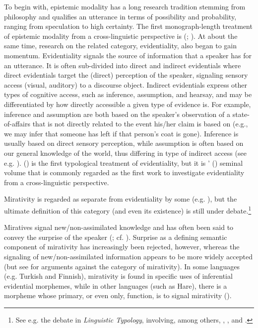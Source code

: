 \documentclass[output=paper]{langsci/langscibook}
\begin{document}
To begin with, epistemic modality has a long research tradition stemming from philosophy and qualifies an utterance in terms of possibility and probability, ranging from speculation to high certainty. The first monograph-length treatment of epistemic modality from a cross-linguistic perspective is \citeauthor{Palmer1986} (\citeyear{Palmer1986}; \citeyear{Palmer2001}). At about the same time, research on the related category, evidentiality, also began to gain momentum. Evidentiality signals the source of information that a speaker has for an utterance. It is often sub-divided into direct and indirect evidentials where direct evidentials target the (direct) perception of the speaker, signaling sensory access (visual, auditory) to a discourse object. Indirect evidentials express other types of cognitive access, such as inference, assumption, and hearsay, and may be differentiated by how directly accessible a given type of evidence is. For example, inference and assumption are both based on the speaker’s observation of a state-of-affairs that is not directly related to the event his/her claim is based on (e.g., we may infer that someone has left if that person’s coat is gone). Inference is usually based on direct sensory perception, while assumption is often based on our general knowledge of the world, thus differing in type of indirect access (see e.g. \citealt{Willett1988}). \citeauthor{Aikhenvald2004} (\citeyear{Aikhenvald2004}) is the first typological treatment of evidentiality, but it is \citeauthor{ChafeNichols1986}’ (\citeyear{ChafeNichols1986}) seminal volume that is commonly regarded as the first work to investigate evidentiality from a cross-linguistic perspective.

Mirativity is regarded as separate from evidentiality by some (e.g. \citealt{DeLancey1997}), but the ultimate definition of this category (and even its existence) is still under debate.\footnote{See e.g. the debate in \emph{Linguistic Typology}, involving, among others, \cite{Hill2012}, \cite{DeLancey2012}, and \cite{HengeveldOlbertz2012}.}

Miratives signal new/non-assimilated knowledge and has often been said to convey the surprise of the speaker (\citealt{DeLancey1997}; cf. \citealt{Aikhenvald2014}). Surprise as a defining semantic component of mirativity has increasingly been rejected, however, whereas the signaling of new/non-assimilated information appears to be more widely accepted (but see \citealt{Hill2012} for arguments against the category of mirativity). In some languages (e.g. Turkish and Finnish), mirativity is found in specific uses of inferential evidential morphemes, while in other languages (such as Hare), there is a morpheme whose primary, or even only, function, is to signal mirativity (\citealt{DeLancey1997}).
\end{document}
